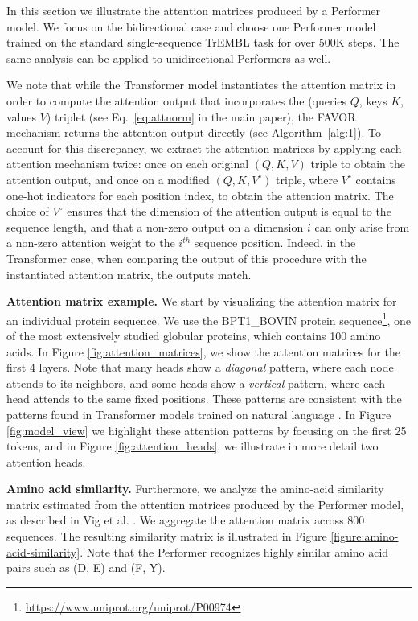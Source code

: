 In this section we illustrate the attention matrices produced by a Performer model. We focus on the bidirectional case and choose one Performer model trained on the standard single-sequence TrEMBL task for over 500K steps. The same analysis can be applied to unidirectional Performers as well.

We note that while the Transformer model instantiates the attention matrix in order to compute the attention output that incorporates the (queries $Q$, keys $K$, values $V$) triplet (see Eq.~\ref{eq:attnorm} in the main paper), the FAVOR mechanism returns the attention output directly (see Algorithm~\ref{alg:1}). To account for this discrepancy, we extract the attention matrices by applying each attention mechanism twice: once on each original $(Q, K, V)$ triple to obtain the attention output, and once on a modified $(Q, K, V^\circ)$ triple, where $V^\circ$ contains one-hot indicators for each position index, to obtain the attention matrix. The choice of $V^\circ$ ensures that the dimension of the attention output is equal to the sequence length, and that a non-zero output on a dimension $i$ can only arise from a non-zero attention weight to the $i^{th}$ sequence position. Indeed, in the Transformer case, when comparing the output of this procedure with the instantiated attention matrix, the outputs match.

\textbf{Attention matrix example.} We start by visualizing the attention matrix for an individual protein sequence. We use the BPT1\_BOVIN protein sequence\footnote{\url{https://www.uniprot.org/uniprot/P00974}}, one of the most extensively studied globular proteins, which contains 100 amino acids. In Figure \ref{fig:attention_matrices}, we show the attention matrices for the first 4 layers. Note that many heads show a \textit{diagonal} pattern, where each node attends to its neighbors, and some heads show a \textit{vertical} pattern, where each head attends to the same fixed positions. These patterns are consistent with the patterns found in Transformer models trained on natural language \citep{kovaleva2019revealing}. In Figure \ref{fig:model_view} we highlight these attention patterns by focusing on the first 25 tokens, and in Figure \ref{fig:attention_heads}, we illustrate in more detail two attention heads.

\textbf{Amino acid similarity.} Furthermore, we analyze the amino-acid similarity matrix estimated from the attention matrices produced by the Performer model, as described in Vig et al. \citep{bertology}. We aggregate the attention matrix across 800 sequences. The resulting similarity matrix is illustrated in Figure \ref{figure:amino-acid-similarity}. Note that the Performer recognizes highly similar amino acid pairs such as (D, E) and (F, Y).

